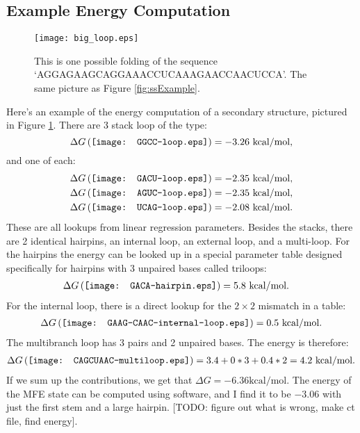 \subsection{Example Energy Computation}

\begin{figure}[t]
  \texttt{[image: big\_loop.eps]}
  \captionsetup{singlelinecheck=off}
  \caption[.]{ This is one possible folding of the sequence
    `AGGAGAAGCAGGAAACCUCAAAGAACCAACUCCA'. The same picture as Figure
    \ref{fig:ssExample}.  }
  \label{fig:bigLoop}
\end{figure}

Here's an example of the energy computation of a secondary structure,
pictured in Figure \ref{fig:bigLoop}. There are 3 stack loop of the type:
\begin{equation}
  \Delta G \left ( \vcenter{\hbox{\texttt{[image: GGCC-loop.eps]}}}
  \right ) = -3.26 \text{ kcal/mol},
\end{equation}
and one of each:
\begin{align}
  &\Delta G \left ( \vcenter{\hbox{\texttt{[image: GACU-loop.eps]}}}
  \right ) = -2.35 \text{ kcal/mol},\\ 
  &\Delta G \left ( \vcenter{\hbox{\texttt{[image: AGUC-loop.eps]}}}
  \right ) = -2.35 \text{ kcal/mol},\\
  &\Delta G \left ( \vcenter{\hbox{\texttt{[image: UCAG-loop.eps]}}}
  \right ) = -2.08 \text{ kcal/mol}.
\end{align}
These are all lookups from linear regression parameters. Besides the
stacks, there are 2 identical hairpins, an internal loop, an external
loop, and a multi-loop. For the hairpins the energy can be looked up
in a special parameter table designed specifically for hairpins with 3
unpaired bases called triloops:
\begin{align}
  \Delta G \left ( \vcenter{\hbox{\texttt{[image: GACA-hairpin.eps]}}}
  \right ) &= 5.8 \text{ kcal/mol}.
\end{align}
For the internal loop, there is a direct lookup for the $2 \times 2$
mismatch in a table:
\begin{align}
  \Delta G \left ( \vcenter{\hbox{\texttt{[image: GAAG-CAAC-internal-loop.eps]}}}
  \right ) = 0.5 \text{ kcal/mol}.
\end{align}
The multibranch loop has 3 pairs and 2 unpaired bases. The energy is therefore:
\begin{align}
  \Delta G \left (\vcenter{\hbox{\texttt{[image: CAGCUAAC-multiloop.eps]}}}
  \right ) = 3.4 + 0*3 + 0.4*2 = 4.2 \text{ kcal/mol}.
\end{align}
If we sum up the contributions, we get that $\Delta G = -6.36 \text{
  kcal/mol}$. The energy of the MFE state can be computed using
software, and I find it to be $-3.06$ with just the first stem and a
large hairpin. [TODO: figure out what is wrong, make ct file, find energy].

